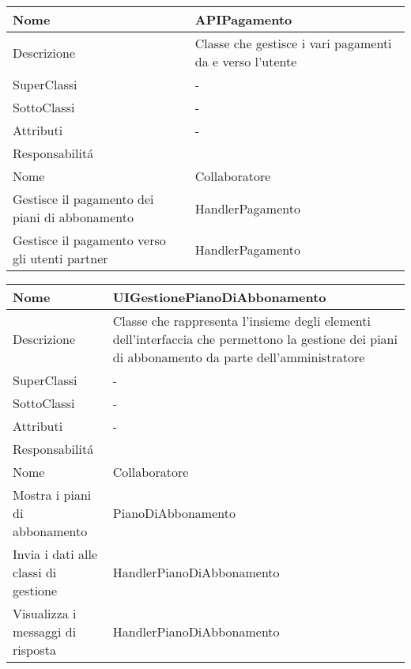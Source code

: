 \begin{center}
    \begin{longtable}{ |p{3cm}|p{3cm}|p{3cm}|p{3cm}| }
        \hline
        Nome & \multicolumn{3}{|p{9cm}|}{APIPagamento} \\\hline
        Descrizione & \multicolumn{3}{|p{9cm}|}{Classe che gestisce i vari pagamenti da e verso l'utente} \\\hline
        SuperClassi & \multicolumn{3}{|p{9cm}|}{-} \\\hline
        SottoClassi & \multicolumn{3}{|p{9cm}|}{-} \\\hline
        Attributi & \multicolumn{3}{|p{9cm}|}{-} \\\hline
        \multicolumn{4}{|p{12cm}|}{Responsabilit\'a} \\\hline
        \multicolumn{2}{|p{6cm}|}{Nome} & \multicolumn{2}{|p{6cm}|}{Collaboratore} \\\hline
        \multicolumn{2}{|p{6cm}|}{Gestisce il pagamento dei piani di abbonamento} & \multicolumn{2}{|p{6cm}|}{HandlerPagamento} \\\hline
        \multicolumn{2}{|p{6cm}|}{Gestisce il pagamento verso gli utenti partner} & \multicolumn{2}{|p{6cm}|}{HandlerPagamento} \\\hline
    \end{longtable}
\end{center}

\begin{center}
    \begin{longtable}{ |p{3cm}|p{3cm}|p{3cm}|p{3cm}| }
        \hline
        Nome & \multicolumn{3}{|p{9cm}|}{UIGestionePianoDiAbbonamento} \\\hline
        Descrizione & \multicolumn{3}{|p{9cm}|}{Classe che rappresenta l'insieme degli elementi dell'interfaccia che permettono la gestione dei piani di abbonamento da parte dell'amministratore} \\\hline
        SuperClassi & \multicolumn{3}{|p{9cm}|}{-} \\\hline
        SottoClassi & \multicolumn{3}{|p{9cm}|}{-} \\\hline
        Attributi & \multicolumn{3}{|p{9cm}|}{-} \\\hline
        \multicolumn{4}{|p{12cm}|}{Responsabilit\'a} \\\hline
        \multicolumn{2}{|p{5cm}|}{Nome} & \multicolumn{2}{|p{7cm}|}{Collaboratore} \\\hline
        \multicolumn{2}{|p{5cm}|}{Mostra i piani di abbonamento} & \multicolumn{2}{|p{7cm}|}{PianoDiAbbonamento} \\\hline
        \multicolumn{2}{|p{5cm}|}{Invia i dati alle classi di gestione} & \multicolumn{2}{|p{7cm}|}{HandlerPianoDiAbbonamento} \\\hline
        \multicolumn{2}{|p{5cm}|}{Visualizza i messaggi di risposta} & \multicolumn{2}{|p{7cm}|}{HandlerPianoDiAbbonamento} \\\hline
    \end{longtable}
\end{center}

